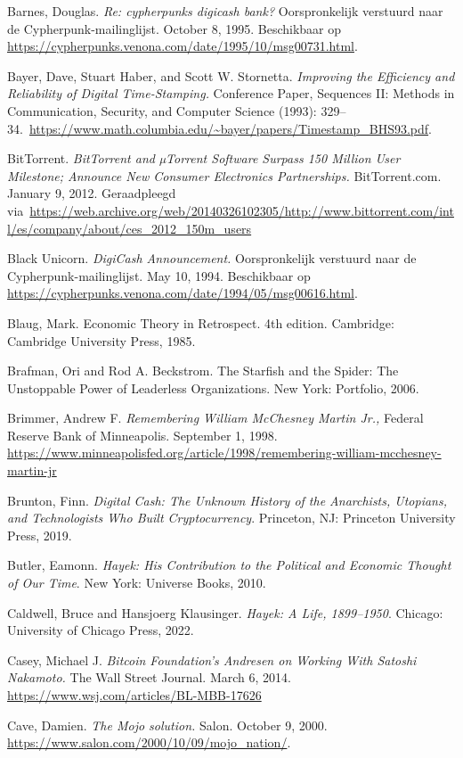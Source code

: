 \documentclass[
  a5paper,
  smalldemyvopaper,11pt,twoside,onecolumn,openright,extrafontsizes,
hidelinks]{memoir}
\begin{document}
Barnes, Douglas. \emph{Re: cypherpunks digicash bank?} Oorspronkelijk
verstuurd naar de Cypherpunk-mailinglijst. October 8, 1995. Beschikbaar
op \url{https://cypherpunks.venona.com/date/1995/10/msg00731.html}.

Bayer, Dave, Stuart Haber, and Scott W. Stornetta. \emph{Improving the
Efficiency and Reliability of Digital Time-Stamping.} Conference Paper,
Sequences II: Methods in Communication, Security, and Computer Science
(1993):
329--34.~\url{https://www.math.columbia.edu/~bayer/papers/Timestamp_BHS93.pdf}.

BitTorrent. \emph{BitTorrent and µTorrent Software Surpass 150 Million
User Milestone; Announce New Consumer Electronics Partnerships.}
BitTorrent.com. January 9, 2012. Geraadpleegd
via~\url{https://web.archive.org/web/20140326102305/http://www.bittorrent.com/intl/es/company/about/ces_2012_150m_users}

Black Unicorn. \emph{DigiCash Announcement.} Oorspronkelijk verstuurd
naar de Cypherpunk-mailinglijst. May 10, 1994. Beschikbaar op
\url{https://cypherpunks.venona.com/date/1994/05/msg00616.html}.

Blaug, Mark. Economic Theory in Retrospect. 4th edition. Cambridge:
Cambridge University Press, 1985.

Brafman, Ori and Rod A. Beckstrom. The Starfish and the Spider: The
Unstoppable Power of Leaderless Organizations. New York: Portfolio,
2006.

Brimmer, Andrew F. \emph{Remembering William McChesney Martin Jr.,}
Federal Reserve Bank of Minneapolis. September 1, 1998.
\url{https://www.minneapolisfed.org/article/1998/remembering-william-mcchesney-martin-jr}

Brunton, Finn. \emph{Digital Cash: The Unknown History of the
Anarchists, Utopians, and Technologists Who Built Cryptocurrency}.
Princeton, NJ: Princeton University Press, 2019.

Butler, Eamonn. \emph{Hayek: His Contribution to the Political and
Economic Thought of Our Time}. New York: Universe Books, 2010.

Caldwell, Bruce and Hansjoerg Klausinger. \emph{Hayek: A Life,
1899--1950}. Chicago: University of Chicago Press, 2022.

Casey, Michael J. \emph{Bitcoin Foundation's Andresen on Working With
Satoshi Nakamoto.} The Wall Street Journal. March 6, 2014.
\url{https://www.wsj.com/articles/BL-MBB-17626}

Cave, Damien. \emph{The Mojo solution.} Salon. October 9, 2000.
\url{https://www.salon.com/2000/10/09/mojo_nation/}.
\end{document}
